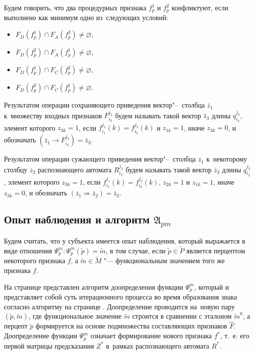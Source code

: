 \begin{Def}
	Будем говорить, что два процедурных признака $f_p^1$ и $f_p^2$ конфликтуют, если выполнено как минимум одно из~следующих условий:
	\begin{itemize}
		\item $F_D(f_p^1)\cap F_A(f_p^2)\not=\varnothing$,
		\item $F_D(f_p^2)\cap F_A(f_p^1)\not=\varnothing$,
		\item $F_D(f_p^1)\cap F_C(f_p^2)\not=\varnothing$,
		\item $F_D(f_p^2)\cap F_C(f_p^1)\not=\varnothing$.
	\end{itemize}
\end{Def}

\begin{Def}
	Результатом операции сохраняющего приведения вектор"--~столбца $\bar z_1$ к~множеству входных признаков $F_{i_2}^{j_2}$ будем называть такой вектор $\bar z_3$ длины $q_{i_2}^{j_2}$, элемент которого $z_{3k}=1$, если $f_{i_1}^{j_1}(k)=f_{i_2}^{j_2}(k)$ и $z_{1k}=1$, иначе $z_{3k}=0$, и обозначать $(\bar z_1\rightarrow F_{i_2}^{j_2})=\bar z_3$.
\end{Def}

\begin{Def}
	Результатом операции сужающего приведения вектор"--~столбца $\bar z_1$ к~некоторому столбцу $\bar z_2$ распознающего автомата $R_{i_2}^{j_2}$ будем называть такой вектор $\bar z_3$ длины $q_{i_2}^{j_2}$, элемент которого $z_{3k}=1$, если $f_{i_1}^{j_1}(k)=f_{i_2}^{j_2}(k)$, $z_{2k}=1$ и $z_{1k}=1$, иначе $z_{3k}=0$, и обозначать $(\bar z_1\Rightarrow \bar z_2)=\bar z_3$.
\end{Def}

\subsection{Опыт наблюдения и алгоритм $\mathfrak A_{pm}$}

Будем считать, что у субъекта имеется опыт наблюдения, который выражается в виде отношения $\Psi_p^m: \Psi_p^m(\tilde p)=\tilde m$, в том случае, если $\tilde p\in\tilde P$ является перцептом некоторого признака $f$, а $\tilde m\in\tilde M$ "--- функциональным значением того же признака $f$.

На странице \pageref{alg:cycle_pm} представлен алгоритм доопределения функции $\Psi_p^m$, который и представляет собой суть итерационного процесса во время образования знака согласно алгоритму на странице \pageref{new_sign_alg}. Доопределение проводится на~новую пару $(\tilde p,\tilde m)$, где функциональное значение $\tilde m$ строится в сравнении с эталоном $\tilde m^0$, а перцепт $\tilde p$ формируется на основе подмножества составляющих признаков $\hat F$. Доопределение функции $\Psi_p^m$ означает формирование нового признака $f^*$, т.~е. его первой матрицы предсказания $Z^*$ в~рамках распознающего автомата $R^*$.

